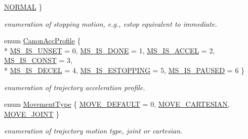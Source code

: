 \begin{DoxyCompactItemize}
\hyperlink{namespaceRCS_a39ae96212f304024b5f91fe8d63a40c0ab9652e079b6284ddf30eb812539260cd}{N\-O\-R\-M\-A\-L}
 \}
\begin{DoxyCompactList}\small\item\em enumeration of stopping motion, e.\-g., estop equivalent to immediate. \end{DoxyCompactList}\item 
enum \hyperlink{namespaceRCS_a452a9217023e577031dcdf7e533b2ead}{Canon\-Acc\-Profile} \{ \\*
\hyperlink{namespaceRCS_a452a9217023e577031dcdf7e533b2eada2315e4dd1ff60cc3c544074b3cf68aca}{M\-S\-\_\-\-I\-S\-\_\-\-U\-N\-S\-E\-T} = 0, 
\hyperlink{namespaceRCS_a452a9217023e577031dcdf7e533b2eada5e3a369ff66b61df6181d0dc65c428b8}{M\-S\-\_\-\-I\-S\-\_\-\-D\-O\-N\-E} = 1, 
\hyperlink{namespaceRCS_a452a9217023e577031dcdf7e533b2eada34d1aa9bce420946f968a49604b118c4}{M\-S\-\_\-\-I\-S\-\_\-\-A\-C\-C\-E\-L} = 2, 
\hyperlink{namespaceRCS_a452a9217023e577031dcdf7e533b2eada7bf5f12a075b086d878fa4e1f7b795ac}{M\-S\-\_\-\-I\-S\-\_\-\-C\-O\-N\-S\-T} = 3, 
\\*
\hyperlink{namespaceRCS_a452a9217023e577031dcdf7e533b2eadabe3f296a699b654071dfed0d62f0707e}{M\-S\-\_\-\-I\-S\-\_\-\-D\-E\-C\-E\-L} = 4, 
\hyperlink{namespaceRCS_a452a9217023e577031dcdf7e533b2eadab136562b5efb4a27c513ce457d7b7cbc}{M\-S\-\_\-\-I\-S\-\_\-\-E\-S\-T\-O\-P\-P\-I\-N\-G} = 5, 
\hyperlink{namespaceRCS_a452a9217023e577031dcdf7e533b2eada092d58e8f17c61485c944eef747369f6}{M\-S\-\_\-\-I\-S\-\_\-\-P\-A\-U\-S\-E\-D} = 6
 \}
\begin{DoxyCompactList}\small\item\em enumeration of trajectory acceleration profile. \end{DoxyCompactList}\item 
enum \hyperlink{namespaceRCS_ab06a825aaa263c253e8100d626609ec4}{Movement\-Type} \{ \hyperlink{namespaceRCS_ab06a825aaa263c253e8100d626609ec4ac969035de1d3dc48e8dd0951863bf23b}{M\-O\-V\-E\-\_\-\-D\-E\-F\-A\-U\-L\-T} = 0, 
\hyperlink{namespaceRCS_ab06a825aaa263c253e8100d626609ec4a080a0390ae2de7ee0ca67d94506a9c79}{M\-O\-V\-E\-\_\-\-C\-A\-R\-T\-E\-S\-I\-A\-N}, 
\hyperlink{namespaceRCS_ab06a825aaa263c253e8100d626609ec4a275cc65ce33e5cfc57c57abb4a208223}{M\-O\-V\-E\-\_\-\-J\-O\-I\-N\-T}
 \}
\begin{DoxyCompactList}\small\item\em enumeration of trajectory motion type, joint or cartesian. \end{DoxyCompactList}\item 

\end{DoxyCompactItemize}

